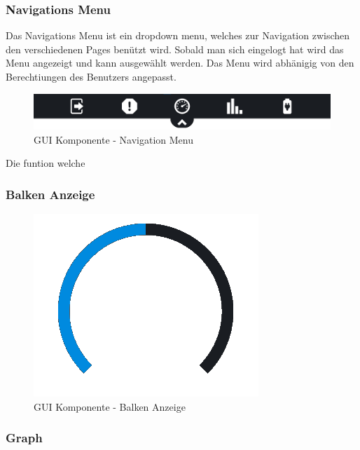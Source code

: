 \subsubsection{Navigations Menu}

Das Navigations Menu ist ein dropdown menu, welches zur Navigation zwischen den verschiedenen Pages benützt wird. Sobald man sich eingelogt hat wird das Menu angezeigt und kann ausgewählt werden. Das Menu wird abhänigig von den Berechtiungen des Benutzers angepasst.

\begin{figure}[H]
	\begin{center}
		\includegraphics[scale=0.2]{figures/hcis/component_menu.png}
		\caption{GUI Komponente - Navigation Menu}
		\label{fig:kompNavigation}
	\end{center}
\end{figure}

Die funtion welche

\subsubsection{Balken Anzeige}

\begin{figure}[H]
	\begin{center}
		\includegraphics[scale=0.5]{figures/hcis/component_bar.png}
		\caption{GUI Komponente - Balken Anzeige}
				\label{fig:kompBalken}
	\end{center}
\end{figure}

\subsubsection{Graph}

